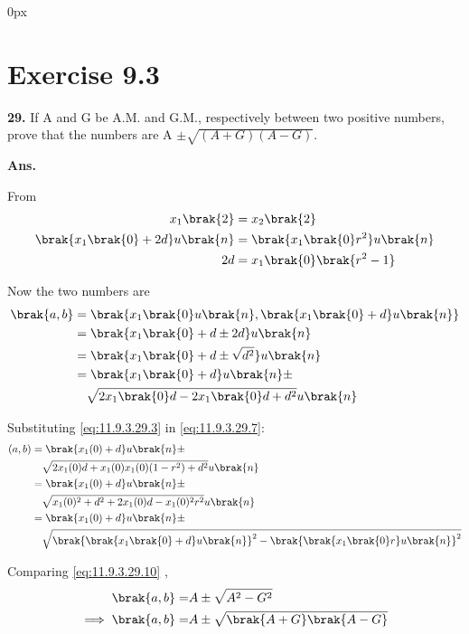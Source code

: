 \documentclass[journal,12pt,twocolumn]{IEEEtran}
\begin{document}
\parindent 0px


\vspace{3cm}
\title{}
\author{EE23BTECH11042 -  Khusinadha Naik$^{*}$
}
\maketitle
\newpage
\bigskip



\section*{Exercise 9.3}

\noindent \textbf{29.} \hspace{2pt}If A and G be A.M. and G.M., respectively between two positive numbers, prove that the numbers are A $\pm \sqrt{(A+G)(A-G)}$. 

\noindent \textbf{Ans.}\\


\begin{table}[h]

\end{table}

\noindent From 
\begin{align}
x_1\brak{2} &= x_2\brak{2} \\
\brak{x_1\brak{0} + 2d }u\brak{n} &= \brak{x_1\brak{0} r^{2}}u\brak{n} \\
2d &= x_1\brak{0}\brak{r^{2} - 1}  \label{eq:11.9.3.29.3}
\end{align}

Now the two numbers are 
\begin{align}
	\brak{a,b} &= \brak{x_1\brak{0}u\brak{n} , \brak{x_1\brak{0} + d} u\brak{n}} \\
&=\brak{x_1\brak{0} + d \pm 2d} u\brak{n} \\
&=\brak{x_1\brak{0} + d \pm \sqrt{d^{2}}} u\brak{n} \\
\notag &=\brak{x_1\brak{0} + d } u\brak{n}\pm\\
& \quad  \sqrt{2x_1\brak{0}d - 2x_1\brak{0}d + d^{2}}  u\brak{n} \label{eq:11.9.3.29.7}
\end{align}

Substituting \eqref{eq:11.9.3.29.3} in \eqref{eq:11.9.3.29.7}:
\begin{align}
\notag (a,b) &= \brak{x_1(0) + d } u\brak{n}\pm \\ 
& \quad \sqrt{2x_1(0)d + x_1(0)  x_1(0)  (1 - r^{2}) + d^{2}} u\brak{n} \\
\notag &= \brak{x_1(0) + d } u\brak{n}\pm \\ 
& \quad \sqrt{x_1(0)^2 + d^2 + 2x_1(0)d - x_1(0)^2r^2} u\brak{n} \\
\notag &= \brak{x_1(0) + d } u\brak{n}\pm \\
& \quad \sqrt{ \brak{\brak{x_1\brak{0} + d} u\brak{n}}^2 - \brak{\brak{x_1\brak{0} r}u\brak{n}}^2}\label{eq:11.9.3.29.10}
\end{align}
\pagebreak

\noindent Comparing \eqref{eq:11.9.3.29.10} ,  
\begin{align}
\brak{a,b} =& A \pm \sqrt{A^2 - G^2} \\
\implies \brak{a,b} =& A \pm \sqrt{\brak{A + G}\brak{A - G}}
\end{align}
\end{document}
